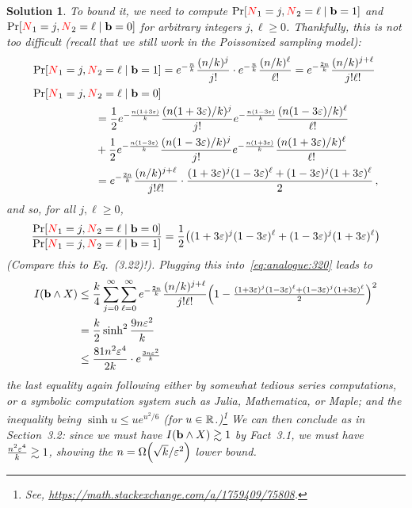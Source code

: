 \documentclass[biber]{nowfnt} %
\newtheorem{solution}{Solution}[chapter]
\newcommand{\occur}{\textcolor{red}{N}}
\newcommand{\occur}{N}
\begin{document}
\begin{solution}
 To bound it, we need to compute $\bPr{\occur_1=j, \occur_2 = \ell\mid \mathbf{b}=\accept }$ and $\bPr{\occur_1=j, \occur_2 = \ell\mid \mathbf{b}=\reject }$ for arbitrary integers $j,\ell\geq 0$. Thankfully, this is not too difficult (recall that we still work in the Poissonized sampling model):
\begin{align*}
\bPr{\occur_1=j, \occur_2 = \ell\mid \mathbf{b}=\accept }
&= e^{-\frac{\ns}{\ab}} \frac{(\ns/\ab)^j}{j!}\cdot e^{-\frac{\ns}{\ab}} \frac{(\ns/\ab)^\ell}{\ell!}
= e^{-\frac{2\ns}{\ab}} \frac{(\ns/\ab)^{j+\ell}}{j!\ell!} \\
\bPr{\occur_1=j, \occur_2 = \ell\mid \mathbf{b}=\reject } \\
&\hspace{-6em}= \frac{1}{2} e^{-\frac{\ns(1+3\dst)}{\ab}} \frac{(\ns(1+3\dst)/\ab)^j}{j!} e^{-\frac{\ns(1-3\dst)}{\ab}} \frac{(\ns(1-3\dst)/\ab)^\ell}{\ell!}  \\
&\hspace{-6em}+ \frac{1}{2} e^{-\frac{\ns(1-3\dst)}{\ab}} \frac{(\ns(1-3\dst)/\ab)^j}{j!} e^{-\frac{\ns(1+3\dst)}{\ab}} \frac{(\ns(1+3\dst)/\ab)^\ell}{\ell!} \\
&\hspace{-6em}=  e^{-\frac{2\ns}{\ab}} \frac{(\ns/\ab)^{j+\ell}}{j!\ell!} \cdot \frac{(1+3\dst)^j(1-3\dst)^\ell+(1-3\dst)^j(1+3\dst)^\ell}{2}\,,
\end{align*}
and so, for all $j,\ell\geq 0$,
\begin{equation}
\frac{\bPr{\occur_1=j, \occur_2 = \ell\mid \mathbf{b}=\reject }}{\bPr{\occur_1=j, \occur_2 = \ell\mid \mathbf{b}=\accept }} = \frac{1}{2}\Paren{(1+3\dst)^j(1-3\dst)^\ell+(1-3\dst)^j(1+3\dst)^\ell}
\end{equation}
\emph{(Compare this to Eq.~(3.22)!)}. Plugging this into~\cref{eq:analogue:320} leads to
\begin{align}
	\mutualinfo{\mathbf{b}}{X} 
	&\leq \frac{\ab}{4} \sum_{j=0}^\infty\sum_{\ell=0}^\infty e^{-\frac{2\ns}{\ab}} \frac{(\ns/\ab)^{j+\ell}}{j!\ell!}\Paren{1- \tfrac{(1+3\dst)^j(1-3\dst)^\ell+(1-3\dst)^j(1+3\dst)^\ell}{2} }^2 \notag\\
	&=  \frac{\ab}{2} \sinh^2 \frac{9\ns \dst^2}{\ab} \notag\\
	&\leq \frac{81\ns^2 \dst^4}{2\ab} \cdot e^{\frac{3\ns \dst^2}{\ab}}
\end{align}
the last equality again following either by somewhat tedious series computations, or a symbolic computation system such as Julia, Mathematica, or Maple; and the inequality being $\sinh u \leq u e^{u^2/6}$ (for $u\in\mathbb{R}$.)\footnote{See, \eg \url{https://math.stackexchange.com/a/1759409/75808}.} We can then conclude as in Section~3.2: since we must have $\mutualinfo{\mathbf{b}}{X}  \gtrsim 1$ by Fact~3.1, we must have $\frac{n^2 \varepsilon^4}{k} \gtrsim 1$, showing the $\ns = \bigOmega{\sqrt{\ab}/\dst^2}$ lower bound.
\end{solution}
\end{document}
